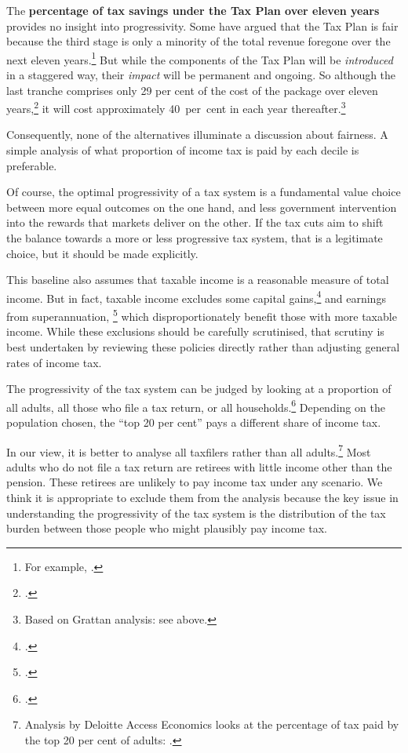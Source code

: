 \documentclass[submission]{grattan}\usepackage[]{graphicx}\usepackage[]{color}
\begin{document}
The \textbf{percentage of tax savings under the Tax Plan over eleven years} provides no insight into progressivity. Some have argued that the Tax Plan is fair because the third stage is only a minority of the total revenue foregone over the next eleven years.\footnote{For example, \textcite{Kelly2018}.}
But while the components of the Tax Plan will be \emph{introduced} in a staggered way, their \emph{impact} will be permanent and ongoing. So although the last tranche comprises only 29 per cent of the cost of the package over eleven years,\footcite[][2]{Treasury2018c}
it will cost approximately 40~per~cent in each year thereafter.\footnote{Based on Grattan analysis: see  above.}

Consequently, none of the alternatives illuminate a discussion about fairness. A simple analysis of what proportion of income tax is paid by each decile is preferable.

Of course, the optimal progressivity of a tax system is a fundamental value choice between more equal outcomes on the one hand, and less government intervention into the rewards that markets deliver on the other. If the tax cuts aim to shift the balance towards a more or less progressive tax system, that is a legitimate choice, but it should be made explicitly.

This baseline also assumes that taxable income is a reasonable measure of total income. But in fact, taxable income excludes some capital gains,\footcite{DaleyWood2016-Negative-Gearing-CGT} and earnings from superannuation,%
  \footcites{DaleyCoatesWood-2015-Super-tax-targeting}{Daley-etal-2016-Assessing-2016-super-tax-reforms} which disproportionately benefit those with more taxable income. While these exclusions should be carefully scrutinised, that scrutiny is best undertaken by reviewing these policies directly rather than adjusting general rates of income tax.

The progressivity of the tax system can be judged by looking at a proportion of all adults, all those who file a tax return, or all households.\footcite{Gothe}
Depending on the population chosen, the ``top 20 per cent'' pays a different share of income tax.

In our view, it is better to analyse all taxfilers rather than all adults.\footnote{Analysis by Deloitte Access Economics looks at the percentage of tax paid by the top 20 per cent of adults: \textcite{Greber}.}
Most adults who do not file a tax return are retirees with little income other than the pension. These retirees are unlikely to pay income tax under any scenario. We think it is appropriate to exclude them from the analysis because the key issue in understanding the progressivity of the tax system is the distribution of the tax burden between those people who might plausibly pay income tax.
\end{document}
